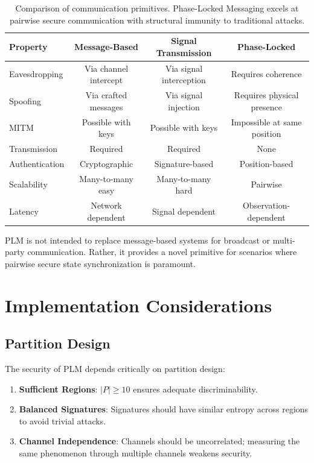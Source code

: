 \documentclass[11pt,a4paper]{article}
\theoremstyle{definition}
\begin{document}
\begin{table}[h]
\centering
\begin{tabular}{|l|c|c|c|}
\hline
\textbf{Property} & \textbf{Message-Based} & \textbf{Signal Transmission} & \textbf{Phase-Locked} \\
\hline
Eavesdropping & Via channel intercept & Via signal interception & Requires coherence \\
Spoofing & Via crafted messages & Via signal injection & Requires physical presence \\
MITM & Possible with keys & Possible with keys & Impossible at same position \\
Transmission & Required & Required & None \\
Authentication & Cryptographic & Signature-based & Position-based \\
Scalability & Many-to-many easy & Many-to-many hard & Pairwise \\
Latency & Network dependent & Signal dependent & Observation-dependent \\
\hline
\end{tabular}
\caption{Comparison of communication primitives. Phase-Locked Messaging excels at pairwise secure communication with structural immunity to traditional attacks.}
\end{table}

PLM is not intended to replace message-based systems for broadcast or multi-party communication. Rather, it provides a novel primitive for scenarios where pairwise secure state synchronization is paramount.

\section{Implementation Considerations}
\label{sec:implementation}

\subsection{Partition Design}

The security of PLM depends critically on partition design:
\begin{enumerate}
\item \textbf{Sufficient Regions}: $|P| \geq 10$ ensures adequate discriminability.
\item \textbf{Balanced Signatures}: Signatures should have similar entropy across regions to avoid trivial attacks.
\item \textbf{Channel Independence}: Channels should be uncorrelated; measuring the same phenomenon through multiple channels weakens security.
\end{enumerate}
\end{document}
